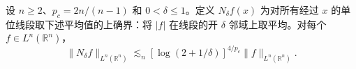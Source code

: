 设 \(n\ge2\)、\(p_c=2n/(n-1)\) 和 \(0<\delta\le1\)。定义 \(N_\delta f(x)\) 为对所有经过 \(x\) 的单位线段取下述平均值的上确界：将 \(|f|\) 在线段的开 \(\delta\) 邻域上取平均。对每个 \(f\in L^n(\mathbb R^n)\)，
\[
 \|N_\delta f\|_{L^n(\mathbb R^n)}
 \lesssim_n [\log(2+1/\delta)]^{4/p_c}\|f\|_{L^n(\mathbb R^n)} .
\]
